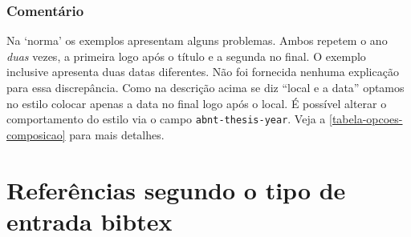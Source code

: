 \documentclass[a4paper]{ltxdoc}
\begin{document}
\subsubsection{Comentário}
Na `norma' os exemplos  apresentam alguns
problemas. Ambos repetem o ano \emph{duas} vezes, a primeira logo após o título
e a segunda no final. O exemplo  inclusive apresenta
duas datas diferentes. Não foi fornecida nenhuma explicação para essa
discrepância. Como na descrição acima se diz ``local e a data'' optamos no
estilo colocar apenas a data no final logo após o local. É possível alterar o
comportamento do estilo via o campo {\tt abnt-thesis-year}. Veja a
\autoref{tabela-opcoes-composicao} para mais detalhes.

\section{Referências segundo o tipo de entrada \textsf{bibtex}}
\end{document}
